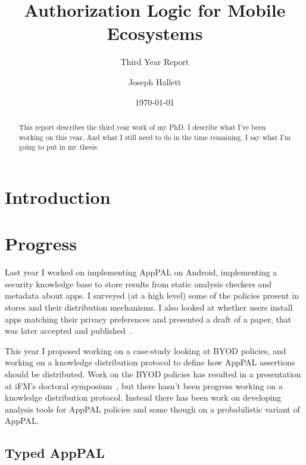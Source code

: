 \documentclass[a4paper]{scrartcl}
\title{Authorization Logic for Mobile Ecosystems}
\subtitle{Third Year Report}
\author{Joseph Hallett}
\date\today
\begin{document}
\maketitle

\begin{abstract}
  This report describes the third year work of my PhD.
  I describe what I've been working on this year,
  And what I still need to do in the time remaining.
  I say what I'm going to put in my thesis.
\end{abstract}

\section{Introduction}
\label{sec:introduction}

\section{Progress}
\label{sec:work}

Last year I worked on implementing AppPAL on Android, implementing a security
knowledge base to store results from static analysis checkers and metadata about
apps.  I surveyed (at a high level) some of the policies present in stores and
their distribution mechanisms.  I also looked at whether users install apps
matching their privacy preferences and presented a draft of a paper, that was
later accepted and published~\cite{hallett_apppal_2016}.

This year I proposed working on a case-study looking at BYOD policies, and
working on a knowledge distribution protocol to define how AppPAL assertions
should be distributed.  Work on the BYOD policies has resulted in a presentation
at iFM's doctoral symposium~\cite{hallett_specifying_2016}, but there hasn't
been progress working on a knowledge distribution protocol.  Instead there has
been work on developing analysis tools for AppPAL policies and some though on a
probabilistic variant of AppPAL.

\subsection{Typed AppPAL}
\label{sec:types}
\end{document}
